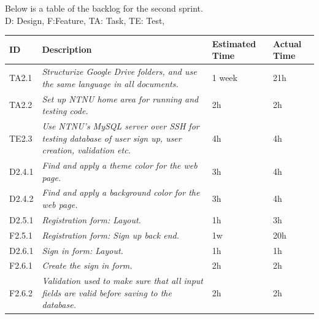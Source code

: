 Below is a table of the backlog for the second sprint. \\ D: Design, F:Feature, TA: Task, TE: Test, 

\begin{minipage}{\linewidth}
\setlength{\tabcolsep}{12pt}
\centering
{}
\begin{tabular}{|p{1cm}|p{4cm}|p{2cm}|p{2cm}|}
\hline
\cellcolor{gray!25} ID & \cellcolor{gray!25} Description & \cellcolor{gray!25} Estimated Time & \cellcolor{gray!25} Actual Time \\
\hline
TA2.1 & \it{Structurize Google Drive folders, and use the same language in all documents.} & 1 week & 21h \\
TA2.2 & \it{Set up NTNU home area for running and testing code.} & 2h & 2h \\
TE2.3 & \it{Use NTNU's MySQL server over SSH for testing database of user sign up, user creation, validation etc. } & 4h & 4h \\
D2.4.1 & \it{Find and apply a theme color for the web page. } & 3h & 4h \\
D2.4.2 & \it{Find and apply a background color for the web page.} & 3h & 4h \\
D2.5.1 & \it{Registration form: Layout.} & 1h & 3h \\
F2.5.1 & \it{Registration form: Sign up back end.} & 1w & 20h \\
D2.6.1 & \it{Sign in form: Layout.} & 1h & 1h \\
F2.6.1 & \it{Create the sign in form.} & 2h & 2h \\
F2.6.2 & \it{Validation used to make sure that all input fields are valid before saving to the database. } & 2h & 2h\\
\hline
\end{tabular}
\end{minipage}

